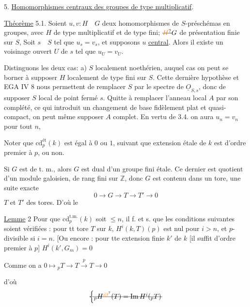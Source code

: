 5. \uline{Homomorphismes centraux des groupes de type multiplicatif}.

\uline{Théorème} 5.1. Soient $u,v:H\quad G$ deux homomorphismes de $S$-préschémas en groupes, avec $H$ de type multiplicatif et de type fini;  $\deleted{\unsure{H}}G$ de présentation finie sur $S$,  Soit $s\quad S$ tel que $u_{s}=v_{s}$, et supposons $u$ \uline{central}. Alors il existe un voisinage ouvert $U$ de $s$ tel que $u_{U}=v_{U}$.

Distinguons les deux cas: a) $S$ localement noethérien, auquel cas on peut se borner à supposer $H$ localement de type fini sur $S$. Cette dernière hypothèse et EGA IV 8 nous permettent de remplacer $S$ par le spectre de $\underline{O}_{S,s}$, donc de supposer $S$ local de point fermé $s$. Quitte à remplacer l'anneau local $A$ par son complété, ce qui introduit un changement de base fidèlement plat et quasi-compact, on peut même supposer $A$ complet. En vertu de 3.4. on aura $u_{n}=v_{n}$ pour tout $n$,


Noter que $\mathrm{cd}_{p}^{\text{ét}}(k)$ est égal à $0$ ou $1$, suivant que  extension  étale de $k$ est d'ordre premier à $p$, ou non.

Si $G$ est de t. m., alors $G$ est dual d'un groupe fini étale. Ce dernier est quotient d'un module galoisien,  de rang fini sur $\mathbb{Z}$, donc $G$ est contenu dans un tore,  une suite exacte
\[
0\longrightarrow G\longrightarrow T\longrightarrow T'\longrightarrow 0
\]
$T$ et $T'$ des tores. D'où le

\uline{Lemme} 2 \quad Pour que $\mathrm{cd}_{p}^{\text{t.m.}}(k)$ soit $\leq n$, il f. et s. que les conditions suivantes soient vérifiées : pour tt tore $T$ sur $k$, $H^{i}(k,T)(p)$ est nul pour $i>n$, et $p$-divisible si $i=n$. [Ou encore : pour tte extension finie  $k'$ de $k$ [il suffit d'ordre premier à $p$]  $H^{i}(k',G_{m})=0$
\margin{si $i>n$, et $H^{n}(k',G_{m})$ est $p$-divisible]}

Comme on a $0\longmapsto {}_{p}T\longrightarrow T\xrightarrow{p}T\longrightarrow 0$

d'où
\[
\deleted{\left\{ {}_{p}H^{\unsure{i|\prime}}(T)=\operatorname{Im} H^{i}({}_{p}T)\right.}
\]

